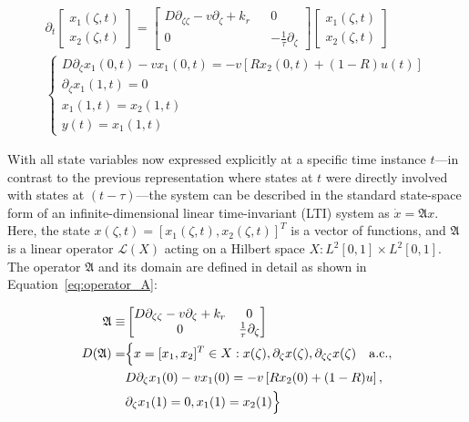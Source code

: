 \begin{align}
    \partial_t 
    \begin{bmatrix}
        x_1(\zeta, t) \\ x_2(\zeta,t)
    \end{bmatrix}
    =
    \begin{bmatrix}
        D \partial_{\zeta \zeta} - v \partial_\zeta + k_r && 0 \\
        0 && -\frac{1}{\tau} \partial_\zeta
    \end{bmatrix}
    \begin{bmatrix}
        x_1(\zeta, t) \\ x_2(\zeta,t)
    \end{bmatrix}\\
\begin{cases}
    D \partial_\zeta x_1(0, t) - v x_1(0, t) = -v \left[ R x_2(0, t) + (1-R) u(t) \right] \\
    \partial_\zeta x_1(1, t) = 0 \\
    x_1(1,t) = x_2(1,t) \\
    y(t) = x_1(1, t)
\end{cases}
\end{align}

With all state variables now expressed explicitly at a specific time instance $t$—in contrast to the previous representation where states at $t$ were directly involved with states at $(t-\tau)$—the system can be described in the standard state-space form of an infinite-dimensional linear time-invariant (LTI) system as $\dot{x} = \mathfrak{A} x$. Here, the state $x(\zeta, t) = [x_1(\zeta, t), x_2(\zeta, t)]^T$ is a vector of functions, and $\mathfrak{A}$ is a linear operator $\mathcal{L}(X)$ acting on a Hilbert space $X: L^2[0,1] \times L^2[0,1]$. The operator $\mathfrak{A}$ and its domain are defined in detail as shown in Equation~\ref{eq:operator_A}:

\begin{equation} \label{eq:operator_A}
    \begin{aligned}
        \mathfrak{A} \equiv&
        \begin{bmatrix}
            D \partial_{\zeta \zeta} - v \partial_\zeta + k_r & 0 \\
            0 & \frac{1}{\tau} \partial_\zeta
        \end{bmatrix}\\
        D(\mathfrak{A}) =& \Bigl\{ x = [x_1, x_2]^T \in X:
        x(\zeta), \partial_\zeta x(\zeta), \partial_{\zeta \zeta} x(\zeta) \quad \mathrm{a.c.},\\
        &D \partial_\zeta x_1(0) - v x_1(0) = -v \left[ R x_2(0) + (1-R) u \right],\\
        &\partial_\zeta x_1(1) = 0,
        x_1(1) = x_2(1) \Bigr\}
    \end{aligned}
\end{equation}

